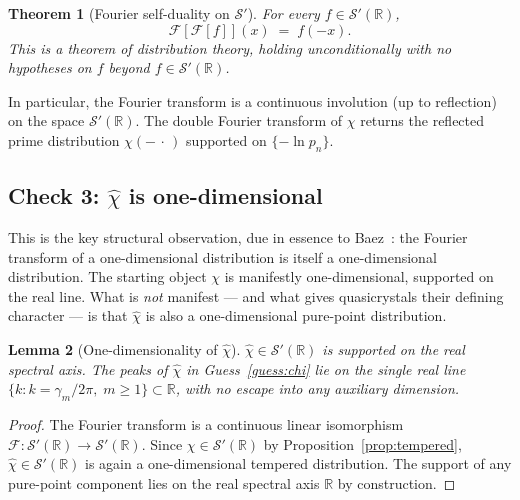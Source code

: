\documentclass[11pt, oneside]{article}
\newtheorem{theorem}{Theorem}[section]
\newtheorem{lemma}[theorem]{Lemma}
\theoremstyle{definition}
\begin{document}
\begin{theorem}[Fourier self-duality on $\mathcal{S}'$]
\label{thm:selfdual}
For every $f \in \mathcal{S}'(\mathbb{R})$,
\begin{equation}
  \mathcal{F}\!\left[\mathcal{F}[f]\right](x)
   \;=\; f(-x).
  \label{eq:selfdual}
\end{equation}
This is a theorem of distribution theory, holding unconditionally
with no hypotheses on $f$ beyond
$f \in \mathcal{S}'(\mathbb{R})$.
\end{theorem}

In particular, the Fourier transform is a continuous involution
(up to reflection) on the space $\mathcal{S}'(\mathbb{R})$. The
double Fourier transform of $\chi$ returns the reflected prime
distribution $\chi(-\,\cdot\,)$ supported on $\{-\ln p_n\}$.

\subsection{Check 3: $\hat\chi$ is one-dimensional}
\label{app:check3}

This is the key structural observation, due in essence to
Baez~\cite{Baez2013}: the Fourier transform of a
one-dimensional distribution is itself a one-dimensional
distribution. The starting object $\chi$ is manifestly
one-dimensional, supported on the real line. What is
\emph{not} manifest --- and what gives quasicrystals their
defining character --- is that $\hat\chi$ is also a
one-dimensional pure-point distribution.

\begin{lemma}[One-dimensionality of $\hat\chi$]
\label{lem:1d}
$\hat\chi \in \mathcal{S}'(\mathbb{R})$ is supported on the
real spectral axis. The peaks of $\hat\chi$ in
Guess~\ref{guess:chi} lie on the single real line
$\{k : k = \gamma_m/2\pi,\; m \ge 1\} \subset \mathbb{R}$, with
no escape into any auxiliary dimension.
\end{lemma}

\begin{proof}
The Fourier transform is a continuous linear isomorphism
$\mathcal{F}: \mathcal{S}'(\mathbb{R}) \to \mathcal{S}'(\mathbb{R})$.
Since $\chi \in \mathcal{S}'(\mathbb{R})$ by
Proposition~\ref{prop:tempered}, $\hat\chi \in
\mathcal{S}'(\mathbb{R})$ is again a one-dimensional tempered
distribution. The support of any pure-point component lies on
the real spectral axis $\mathbb{R}$ by construction.
\end{proof}
\end{document}

